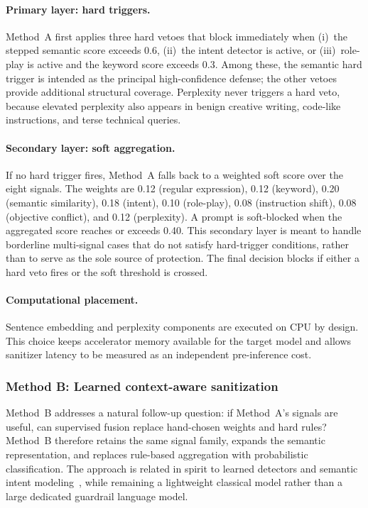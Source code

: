 ﻿\documentclass[10pt]{article}
\begin{document}
\paragraph{Primary layer: hard triggers.}
Method~A first applies three hard vetoes that block immediately when
(i)~the stepped semantic score exceeds 0.6,
(ii)~the intent detector is active, or
(iii)~role-play is active and the keyword score exceeds 0.3.
Among these, the semantic hard trigger is intended as the principal high-confidence defense; the other vetoes provide additional structural coverage.
Perplexity never triggers a hard veto, because elevated perplexity also appears in benign creative writing, code-like instructions, and terse technical queries.

\paragraph{Secondary layer: soft aggregation.}
If no hard trigger fires, Method~A falls back to a weighted soft score over the eight signals.
The weights are
0.12 (regular expression),
0.12 (keyword),
0.20 (semantic similarity),
0.18 (intent),
0.10 (role-play),
0.08 (instruction shift),
0.08 (objective conflict),
and 0.12 (perplexity).
A prompt is soft-blocked when the aggregated score reaches or exceeds 0.40.
This secondary layer is meant to handle borderline multi-signal cases that do not satisfy hard-trigger conditions, rather than to serve as the sole source of protection.
The final decision blocks if either a hard veto fires or the soft threshold is crossed.

\paragraph{Computational placement.}
Sentence embedding and perplexity components are executed on CPU by design.
This choice keeps accelerator memory available for the target model and allows sanitizer latency to be measured as an independent pre-inference cost.

\subsubsection{Method B: Learned context-aware sanitization}
\label{sec:method-b}

Method~B addresses a natural follow-up question: if Method~A's signals are useful, can supervised fusion replace hand-chosen weights and hard rules?
Method~B therefore retains the same signal family, expands the semantic representation, and replaces rule-based aggregation with probabilistic classification.
The approach is related in spirit to learned detectors and semantic intent modeling~\cite{wang2025promptsleuth,shi2025promptarmor}, while remaining a lightweight classical model rather than a large dedicated guardrail language model.
\end{document}
